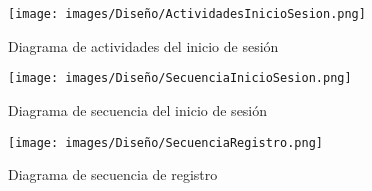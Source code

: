 \begin{figure}
    \centering
    \texttt{[image: images/Diseño/ActividadesInicioSesion.png]}
    \caption{Diagrama de actividades del inicio de sesión}
    \label{dia:actividad_inicio_sesion}
\end{figure}

\begin{figure}
    \centering
    \texttt{[image: images/Diseño/SecuenciaInicioSesion.png]}
    \caption{Diagrama de secuencia del inicio de sesión}
    \label{dia:secuencia_inicio_sesion}
\end{figure}

\begin{figure}
    \centering
    \texttt{[image: images/Diseño/SecuenciaRegistro.png]}
    \caption{Diagrama de secuencia de registro}
    \label{dia:secuencia_registro}
\end{figure}